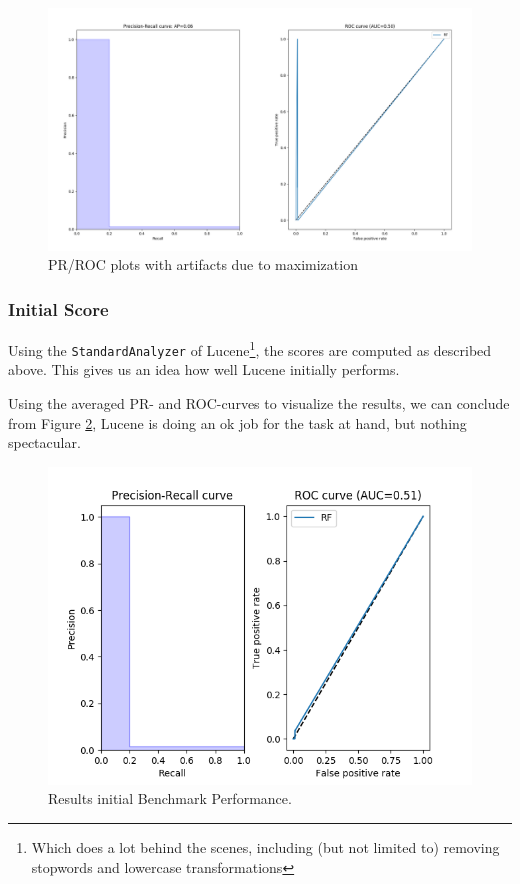 \documentclass[11pt]{article}
\begin{document}
\begin{figure}[htp]
	\centering
	\includegraphics[width=\textwidth]{images/artifact}
	\caption{PR/ROC plots with artifacts due to maximization}
	\label{fig:artifact}
\end{figure}

\subsubsection{Initial Score}
Using the \texttt{StandardAnalyzer} of Lucene\footnote{Which does a lot behind the scenes, including (but not limited to) removing stopwords and lowercase transformations}, the scores are computed as described above. This gives us an idea how well Lucene initially performs.

Using the averaged PR- and ROC-curves to visualize the results, we can conclude from Figure \ref{fig:initBP}, Lucene is doing an ok job for the task at hand, but nothing spectacular.

\begin{figure}[htp]
    \centering
    \includegraphics[width=\textwidth]{images/StandardAnalyzer}
    \caption{Results initial Benchmark Performance.}
    \label{fig:initBP}
\end{figure}
\end{document}
